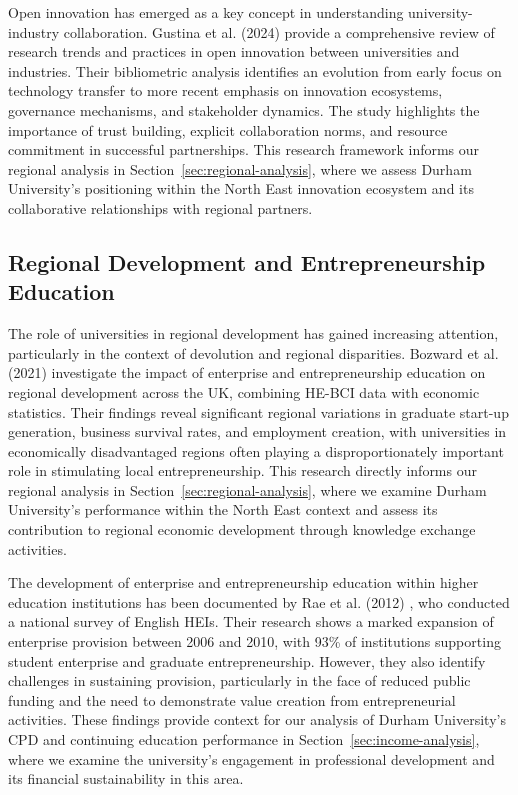 \documentclass[journal,onecolumn, 10pt,draftclsnofoot]{IEEEtran}
\begin{document}
Open innovation has emerged as a key concept in understanding university-industry collaboration. Gustina et al. (2024) \cite{gustina2024open} provide a comprehensive review of research trends and practices in open innovation between universities and industries. Their bibliometric analysis identifies an evolution from early focus on technology transfer to more recent emphasis on innovation ecosystems, governance mechanisms, and stakeholder dynamics. The study highlights the importance of trust building, explicit collaboration norms, and resource commitment in successful partnerships. This research framework informs our regional analysis in Section~\ref{sec:regional-analysis}, where we assess Durham University's positioning within the North East innovation ecosystem and its collaborative relationships with regional partners.

\subsection{Regional Development and Entrepreneurship Education}

The role of universities in regional development has gained increasing attention, particularly in the context of devolution and regional disparities. Bozward et al. (2021) \cite{bozward2021impact} investigate the impact of enterprise and entrepreneurship education on regional development across the UK, combining HE-BCI data with economic statistics. Their findings reveal significant regional variations in graduate start-up generation, business survival rates, and employment creation, with universities in economically disadvantaged regions often playing a disproportionately important role in stimulating local entrepreneurship. This research directly informs our regional analysis in Section~\ref{sec:regional-analysis}, where we examine Durham University's performance within the North East context and assess its contribution to regional economic development through knowledge exchange activities.

The development of enterprise and entrepreneurship education within higher education institutions has been documented by Rae et al. (2012) \cite{rae2012enterprise}, who conducted a national survey of English HEIs. Their research shows a marked expansion of enterprise provision between 2006 and 2010, with 93\% of institutions supporting student enterprise and graduate entrepreneurship. However, they also identify challenges in sustaining provision, particularly in the face of reduced public funding and the need to demonstrate value creation from entrepreneurial activities. These findings provide context for our analysis of Durham University's CPD and continuing education performance in Section~\ref{sec:income-analysis}, where we examine the university's engagement in professional development and its financial sustainability in this area.
\end{document}
